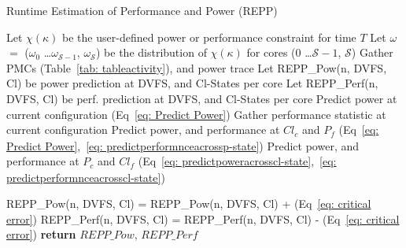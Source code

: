 

\begin{algorithm}%
    \caption{Runtime Estimation of Performance and Power (REPP)}
  \label{pseudo:multi}
  \begin{algorithmic}[1]
      \Statex {}
        \State Let $\chi(\kappa)$ be the user-defined power or performance constraint for time $T$
        \State Let $\omega$ $=$ ($\omega_{\mathit{0}}$ \ldots $\omega_{\mathit{\mathcal S-1}}$, $\omega_{\mathit{\mathcal S}}$) be the distribution of $\chi(\kappa)$ for cores (0 \ldots $\mathcal S-1$, $\mathcal S$)
      \State Gather PMCs (Table~\ref{tab: tableactivity}), and power trace 
      \State Let REPP\_Pow(n, DVFS, Cl) be power prediction at DVFS, and Cl-States per core 
      \Statex {}
      \State Let REPP\_Perf(n, DVFS, Cl) be perf. prediction at DVFS, and Cl-States per core
      \State Predict power at current configuration (Eq~\ref{eq: Predict Power})
      \State Gather performance statistic at current configuration 
      \State Predict power, and performance at $Cl_{\mathit{c}}$ and $P_{\mathit{f}}$ (Eq~\ref{eq: Predict Power},~\ref{eq: predictperformnceacrossp-state})
      \State Predict power, and performance at $P_{\mathit{c}}$ and $Cl_{\mathit{f}}$ (Eq~\ref{eq: predictpoweracrosscl-state},~\ref{eq: predictperformnceacrosscl-state})
      \Statex {}

     
                \State REPP\_Pow(n, DVFS, Cl) = REPP\_Pow(n, DVFS, Cl) + (Eq~\ref{eq: critical error})
                \State REPP\_Perf(n, DVFS, Cl) = REPP\_Perf(n, DVFS, Cl) - (Eq~\ref{eq: critical error})
              \EndFor 
          \EndFor
      \EndFor
      \State \textbf{return} $REPP\_Pow$, $REPP\_Perf$
\EndFunction
    
  \end{algorithmic}
\end{algorithm}


